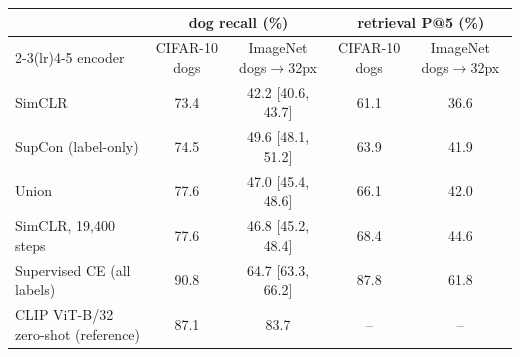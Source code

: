 \begin{tabular}{l cc cc}
\toprule
 & \multicolumn{2}{c}{dog recall (\%)} & \multicolumn{2}{c}{retrieval P@5 (\%)} \\
\cmidrule(lr){2-3}\cmidrule(lr){4-5}
encoder & CIFAR-10 dogs & ImageNet dogs$\to$32px & CIFAR-10 dogs & ImageNet dogs$\to$32px \\
\midrule
SimCLR & 73.4 & 42.2 {\scriptsize[40.6, 43.7]} & 61.1 & 36.6 \\
SupCon (label-only) & 74.5 & 49.6 {\scriptsize[48.1, 51.2]} & 63.9 & 41.9 \\
Union & 77.6 & 47.0 {\scriptsize[45.4, 48.6]} & 66.1 & 42.0 \\
SimCLR, 19,400 steps & 77.6 & 46.8 {\scriptsize[45.2, 48.4]} & 68.4 & 44.6 \\
Supervised CE (all labels) & 90.8 & 64.7 {\scriptsize[63.3, 66.2]} & 87.8 & 61.8 \\
\midrule
CLIP ViT-B/32 zero-shot (reference) & 87.1 & 83.7 & -- & -- \\
\bottomrule
\end{tabular}
